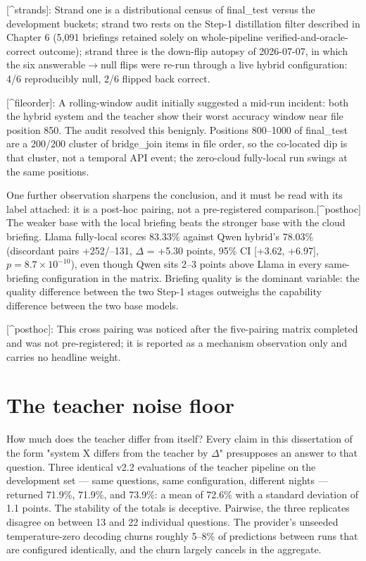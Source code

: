 \documentclass[10pt]{article} %
\begin{document}
[\^{}strands]: Strand one is a distributional census of final\_test versus the development buckets; strand two rests on the Step-1 distillation filter described in Chapter 6 (5,091 briefings retained solely on whole-pipeline verified-and-oracle-correct outcome); strand three is the down-flip autopsy of 2026-07-07, in which the six answerable$\rightarrow$null flips were re-run through a live hybrid configuration: 4/6 reproducibly null, 2/6 flipped back correct.

[\^{}fileorder]: A rolling-window audit initially suggested a mid-run incident: both the hybrid system and the teacher show their worst accuracy window near file position 850. The audit resolved this benignly. Positions 800--1000 of final\_test are a 200/200 cluster of bridge\_join items in file order, so the co-located dip is that cluster, not a temporal API event; the zero-cloud fully-local run swings at the same positions.

One further observation sharpens the conclusion, and it must be read with its label attached: it is a post-hoc pairing, not a pre-registered comparison.[\^{}posthoc] The weaker base with the local briefing beats the stronger base with the cloud briefing. Llama fully-local scores 83.33\% against Qwen hybrid's 78.03\% (discordant pairs +252/--131, $\Delta$ = +5.30 points, 95\% CI [+3.62, +6.97], $p=8.7\times10^{-10}$), even though Qwen sits 2--3 points above Llama in every same-briefing configuration in the matrix. Briefing quality is the dominant variable: the quality difference between the two Step-1 stages outweighs the capability difference between the two base models.

[\^{}posthoc]: This cross pairing was noticed after the five-pairing matrix completed and was not pre-registered; it is reported as a mechanism observation only and carries no headline weight.

\section{The teacher noise floor}\label{sec:the-teacher-noise-floor}

How much does the teacher differ from itself? Every claim in this dissertation of the form "system X differs from the teacher by $\Delta$" presupposes an answer to that question. Three identical v2.2 evaluations of the teacher pipeline on the development set --- same questions, same configuration, different nights --- returned 71.9\%, 71.9\%, and 73.9\%: a mean of 72.6\% with a standard deviation of 1.1 points. The stability of the totals is deceptive. Pairwise, the three replicates disagree on between 13 and 22 individual questions. The provider's unseeded temperature-zero decoding churns roughly 5--8\% of predictions between runs that are configured identically, and the churn largely cancels in the aggregate.
\end{document}
